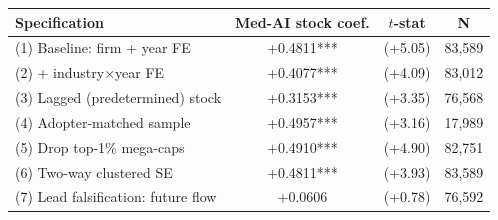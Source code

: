 \begin{tabular}{lccc}
\toprule
Specification & Med-AI stock coef. & $t$-stat & N \\
\midrule
(1) Baseline: firm + year FE & +0.4811*** & (+5.05) & 83,589 \\
(2) + industry$\times$year FE & +0.4077*** & (+4.09) & 83,012 \\
(3) Lagged (predetermined) stock & +0.3153*** & (+3.35) & 76,568 \\
(4) Adopter-matched sample & +0.4957*** & (+3.16) & 17,989 \\
(5) Drop top-1\% mega-caps & +0.4910*** & (+4.90) & 82,751 \\
(6) Two-way clustered SE & +0.4811*** & (+3.93) & 83,589 \\
(7) Lead falsification: future flow & +0.0606 & (+0.78) & 76,592 \\
\bottomrule
\end{tabular}